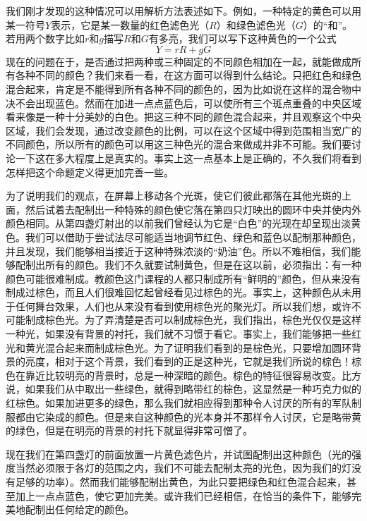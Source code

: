 我们刚才发现的这种情况可以用解析方法表述如下。例如，一种特定的黄色可以用某一符号$Y$表示，它是某一数量的红色滤色光（$R$）和绿色滤色光（$G$）的“和”。若用两个数字比如$r$和$g$描写$R$和$G$有多亮，我们可以写下这种黄色的一个公式
\begin{equation}
    \label{Eq:I:35:1}
    Y = rR + gG
\end{equation}
现在的问题在于，是否通过把两种或三种固定的不同颜色相加在一起，就能做成所有各种不同的颜色？我们来看一看，在这方面可以得到什么结论。只把红色和绿色混合起来，肯定是不能得到所有各种不同的颜色的，因为比如说在这样的混合物中决不会出现蓝色。然而在加进一点点蓝色后，可以使所有三个斑点重叠的中央区域看来像是一种十分美妙的白色。把这三种不同的颜色混合起来，并且观察这个中央区域，我们会发现，通过改变颜色的比例，可以在这个区域中得到范围相当宽广的不同颜色，所以所有的颜色可以用这三种色光的混合来做成并非不可能。我们要讨论一下这在多大程度上是真实的。事实上这一点基本上是正确的，不久我们将看到怎样把这个命题定义得更加完善一些。

为了说明我们的观点，在屏幕上移动各个光斑，使它们彼此都落在其他光斑的上面，然后试着去配制出一种特殊的颜色使它落在第四只灯映出的圆环中央并使内外颜色相同。从第四盏灯射出的以前我们曾经认为它是“白色”的光现在却呈现出淡黄色。我们可以借助于尝试法尽可能适当地调节红色、绿色和蓝色以配制那种颜色，并且发现，我们能够相当接近于这种特殊浓淡的“奶油”色。所以不难相信，我们能够配制出所有的颜色。我们不久就要试制黄色，但是在这以前，必须指出：有一种颜色可能很难制成。教颜色这门课程的人都只制成所有“鲜明的”颜色，但从来没有制成过棕色，而且人们很难回忆起曾经看见过棕色的光。事实上，这种颜色从未用于任何舞台效果，人们也从来没有看到使用棕色光的聚光灯。所以我们想，或许不可能制成棕色光。为了弄清楚是否可以制成棕色光，我们指出，棕色光仅仅是这样一种光，如果没有背景的衬托，我们就不习惯于看它。事实上，我们能够把一些红光和黄光混合起来而制成棕色光。为了证明我们看到的是棕色光，只要增加圆环背景的亮度，相对于这个背景，我们看到的正是这种光，它就是我们所说的棕色！棕色在靠近比较明亮的背景时，总是一种深暗的颜色。棕色的特征很容易改变。比方说，如果我们从中取出一些绿色，就得到略带红的棕色，这显然是一种巧克力似的红棕色。如果加进更多的绿色，那么我们就相应得到那种令人讨厌的所有的军队制服都由它染成的颜色。但是来自这种颜色的光本身并不那样令人讨厌，它是略带黄的绿色，但是在明亮的背景的衬托下就显得非常可憎了。

现在我们在第四盏灯的前面放置一片黄色滤色片，并试图配制出这种颜色（光的强度当然必须限于各灯的范围之内，我们不可能去配制太亮的光色，因为我们的灯没有足够的功率）。然而我们能够配制出黄色，为此只要把绿色和红色混合起来，甚至加上一点点蓝色，使它更加完美。或许我们已经相信，在恰当的条件下，能够完美地配制出任何给定的颜色。

